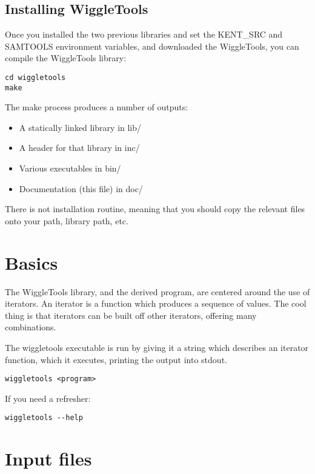 \documentclass[12pt]{article}
\begin{document}
\subsection{Installing WiggleTools}

Once you installed the two previous libraries and set the KENT\_SRC and SAMTOOLS environment variables, and downloaded the WiggleTools, you can compile the WiggleTools library:

\begin{verbatim}
cd wiggletools
make
\end{verbatim}

The make process produces a number of outputs:

\begin{itemize}
\item A statically linked library in lib/
\item A header for that library in inc/
\item Various executables in bin/
\item Documentation (this file) in doc/
\end{itemize}

There is not installation routine, meaning that you should copy the relevant files onto your path, library path, etc.

\section{Basics}

The WiggleTools library, and the derived program, are centered around the use of iterators. An iterator is a function which produces a sequence of values. The cool thing is that iterators can be built off other iterators, offering many combinations. 

The wiggletools executable is run by giving it a string which describes an iterator function, which it executes, printing the output into stdout.

\begin{verbatim}
wiggletools <program>
\end{verbatim}

If you need a refresher:

\begin{verbatim}
wiggletools --help
\end{verbatim}

\section{Input files}
\end{document}

